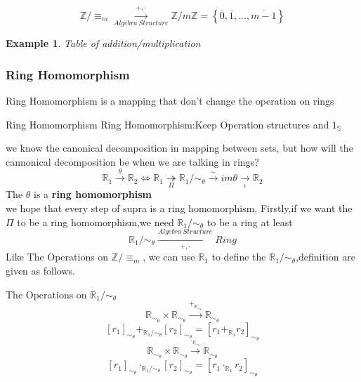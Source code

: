 \documentclass[13pt, a4paper, oneside]{book}
\newtheorem{example}{Example}[section]
\begin{document}
	$$\mathbb{Z}/ \equiv_{m} \overset{+,\cdot}{\underset{Algebra~Structure}{\longrightarrow}} \mathbb{Z} / m\mathbb{Z} = \left\{ \overline{0}, \overline{1}, ... ,\overline{m-1} \right\}$$
	
	\begin{example}
		Table of addition/multiplication
	\end{example}
	
	\subsubsection{Ring Homomorphism}
	Ring Homomorphism is a mapping that don't change the operation on rings
	
	\begin{definition}{Ring Homomorphism}{}
		Ring Homomorphism:Keep Operation structures and $1_\mathbb{S}$
	\end{definition}
	
	we know the canonical decomposition in mapping between sets, but how will the cannonical decomposition be when we are talking in rings? \\
	$$ \mathbb{R}_1 \overset{\theta}{\longrightarrow} \mathbb{R}_2 \Longleftrightarrow \mathbb{R}_1 \underset{\Pi}{\twoheadrightarrow} \mathbb{R}_1 / \sim_{\theta} \overset{\sim}{\longrightarrow} im\theta \underset{\iota}{\longrightarrow} \mathbb{R}_2 $$
	The $\theta$ is a \textbf{ring homomorphism} \\
	we hope that every step of supra is a ring homomorphism, Firstly,if we want the $\Pi$ to be a ring homomorphism,we need $\mathbb{R}_1 /\sim_{\theta}$ to be a ring at least \\
	$$ \mathbb{R}_1 / \sim_\theta \overset{Algebra~Structure}{\underset{+, \cdot}{\longrightarrow}} Ring $$
	Like The Operations on $\mathbb{Z}/ \equiv_{m} $, we can use $\mathbb{R}_1$ to  define the $\mathbb{R}_1 / \sim_{\theta}$,definition are given as follows.
	
	\begin{definition}{The Operations on $\mathbb{R}_1 / \sim_{\theta}$}{}
		$$ \mathbb{R}_{\sim_{\theta}} \times \mathbb{R}_{\sim_{\theta}} \overset{+_{\mathbb{R}_{\sim_{\theta}}}}{\longrightarrow} \mathbb{R}_{\sim_{\theta}} $$
		$$ \left[ r_1 \right]_{\sim_{\theta}} +_{\mathbb{R}_1/ \sim_{\theta}} \left[r_2\right]_{\sim_{\theta}} = \left[r_1 +_{\mathbb{R}_1} r_2\right]_{\sim_{\theta}} $$
		$$ \mathbb{R}_{\sim_{\theta}} \times \mathbb{R}_{\sim_{\theta}} \overset{\cdot_{\mathbb{R}_{\sim_{\theta}}}}{\longrightarrow} \mathbb{R}_{\sim_{\theta}} $$
		$$ \left[ r_1 \right]_{\sim_{\theta}} \cdot_{\mathbb{R}_1/ \sim_{\theta}} \left[r_2\right]_{\sim_{\theta}} = \left[r_1 \cdot_{\mathbb{R}_1} r_2\right]_{\sim_{\theta}} $$
	\end{definition}
	
\end{document}
